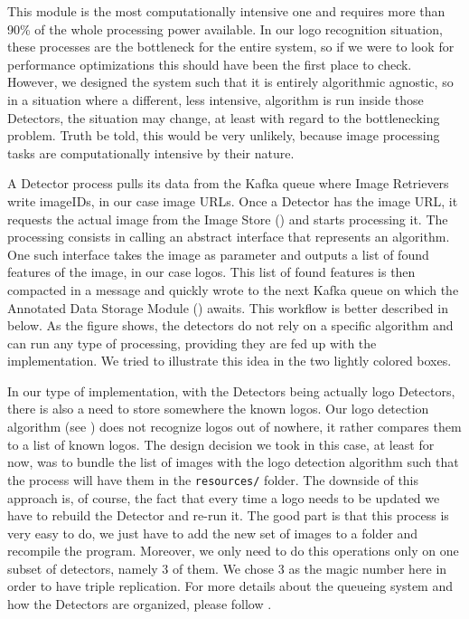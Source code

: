 This module is the most computationally intensive one and requires more than
90\% of the whole processing power available. In our logo recognition
situation, these processes are the bottleneck for the entire system, so if we
were to look for performance optimizations this should have been the first place to
check. However, we designed the system such that it is entirely algorithmic
agnostic, so in a situation where a different, less intensive, algorithm is
run inside those Detectors, the situation may change, at least with regard to
the bottlenecking problem. Truth be told, this would be very unlikely, because
image processing tasks are computationally intensive by their nature.

A Detector process pulls its data from the Kafka queue where Image Retrievers
write imageIDs, in our case image URLs. Once a Detector has the image URL, it
requests the actual image from the Image Store
() and starts processing it. The
processing consists in calling an abstract interface that represents an
algorithm. One such interface takes the image as parameter and outputs a list
of found features of the image, in our case logos. This list of found features
is then compacted in a message and quickly wrote to the next Kafka queue on
which the Annotated Data Storage Module
() awaits. This workflow is
better described in  below. As the figure
shows, the detectors do not rely on a specific algorithm and can
run any type of processing, providing they are fed up with the implementation.
We tried to illustrate this idea in the two lightly colored boxes.

In our type of implementation, with the Detectors being actually logo
Detectors, there is also a need to store somewhere the known logos. Our logo
detection algorithm (see ) does not
recognize logos out of nowhere, it rather compares them to a list of known
logos. The design decision we took in this case, at least for now, was to
bundle the list of images with the logo detection algorithm such that the
process will have them in the \texttt{resources/} folder. The downside of this
approach is, of course, the fact that every time a logo needs to be updated we
have to rebuild the Detector and re-run it. The good part is that this process
is very easy to do, we just have to add the new set of images to a folder
and recompile the program. Moreover, we only need to do this operations only
on one subset of detectors, namely 3 of them. We chose 3 as the magic number
here in order to have triple replication. For more details about the queueing
system and how the Detectors are organized, please follow
.

